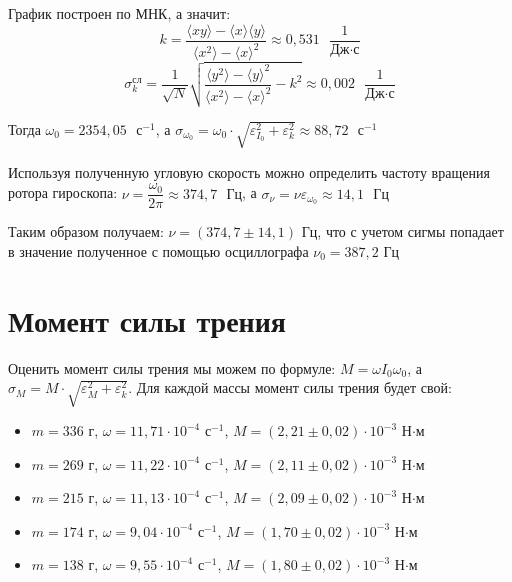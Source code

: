 \documentclass[a4paper,12pt]{article}
\begin{document}
	График построен по МНК, а значит:
	\begin{equation}
	k=\frac{\langle xy\rangle-\langle x\rangle \langle y\rangle}{\langle x^2\rangle - \langle x\rangle^2}\approx 0,531\text{ }\frac{1}{\text{Дж}\cdot\text{с}}
	\end{equation}
	\begin{equation}
		\sigma_k^\text{сл}=\frac{1}{\sqrt{N}}\sqrt{\frac{\langle y^2 \rangle - \langle y \rangle^2}{\langle x^2 \rangle - \langle x \rangle^2} - k^2  } \approx 0,002\text{ }\frac{1}{\text{Дж}\cdot\text{с}}
	\end{equation}

	Тогда $\omega_0 = 2354,05\text{ }\text{с}^{-1}$, а $\sigma_{\omega_0} = \omega_0\cdot\sqrt{\varepsilon_{I_0}^2+ \varepsilon_k^2} \approx 88,72\text{ }\text{с}^{-1}$

	Используя полученную угловую скорость можно определить частоту вращения ротора гироскопа: $\nu = \dfrac{\omega_0}{2\pi} \approx 374,7\text{ }\text{Гц}$, а $\sigma_{\nu} = \nu\varepsilon_{\omega_0} \approx 14,1\text{ }\text{Гц}$

	Таким образом получаем: \underline{$\nu = (374,7\pm14,1)\text{ Гц}$}, что с учетом сигмы попадает в значение полученное с помощью осциллографа $\nu_0 = 387,2\text{ Гц}$

	\section{Момент силы трения}

	Оценить момент силы трения мы можем по формуле: $M = \omega I_0 \omega_0$, а $\sigma_M = M\cdot\sqrt{\varepsilon_M^2+ \varepsilon_k^2}$. Для каждой массы момент силы трения будет свой:

	\begin{itemize}
		\item $m = 336$ г, $\omega = 11,71\cdot 10^{-4}$ $\text{с}^{-1}$, $M = (2,21\pm0,02)\cdot10^{-3}$ Н$\cdot$м
		\item $m = 269$ г, $\omega = 11,22\cdot 10^{-4}$ $\text{с}^{-1}$, $M = (2,11\pm0,02)\cdot10^{-3}$ Н$\cdot$м
		\item $m = 215$ г, $\omega = 11,13\cdot 10^{-4}$ $\text{с}^{-1}$, $M = (2,09\pm0,02)\cdot10^{-3}$ Н$\cdot$м
		\item $m = 174$ г, $\omega = 9,04\cdot 10^{-4}$ $\text{с}^{-1}$, $M = (1,70\pm 0,02)\cdot10^{-3}$ Н$\cdot$м
		\item $m = 138$ г, $\omega = 9,55\cdot 10^{-4}$ $\text{с}^{-1}$, $M = (1,80 \pm 0,02)\cdot10^{-3}$ Н$\cdot$м
	\end{itemize}
\end{document}
